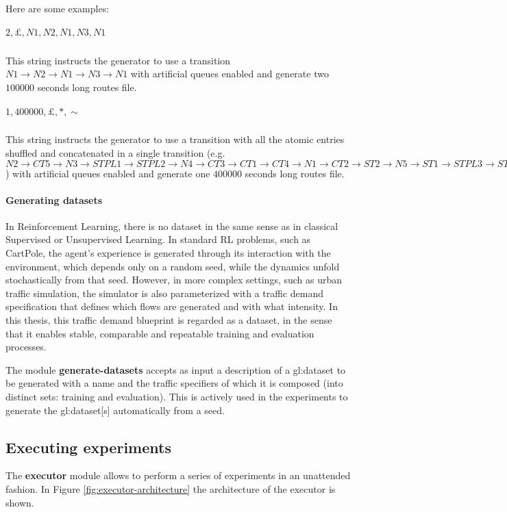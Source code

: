 Here are some examples:

\subparagraph{$2,\pounds,N1,N2,N1,N3,N1$}
This string instructs the generator to use a transition $N1 \rightarrow N2 \rightarrow N1 \rightarrow N3 \rightarrow N1$ with artificial queues enabled and generate two $100000$ seconds long routes file.

\subparagraph{$1,400000,\pounds,*,\sim$}
This string instructs the generator to use a transition with all the atomic entries shuffled and concatenated in a single transition (e.g. $N2 \rightarrow CT5 \rightarrow N3 \rightarrow STPL1 \rightarrow STPL2 \rightarrow N4 \rightarrow CT3 \rightarrow CT1 \rightarrow CT4 \rightarrow N1 \rightarrow CT2 \rightarrow ST2 \rightarrow N5 \rightarrow ST1 \rightarrow STPL3 \rightarrow ST3$) with artificial queues enabled and generate one $400000$ seconds long routes file.

\paragraph{Generating datasets}

In Reinforcement Learning, there is no dataset in the same sense as in classical Supervised or Unsupervised Learning.
In standard RL problems, such as CartPole, the agent’s experience is generated through its interaction with the environment, which depends only on a random seed, while the dynamics unfold stochastically from that seed.
However, in more complex settings, such as urban traffic simulation, the simulator is also parameterized with a traffic demand specification that defines which flows are generated and with what intensity.
In this thesis, this traffic demand blueprint is regarded as a dataset, in the sense that it enables stable, comparable and repeatable training and evaluation processes.

The module \textbf{generate-datasets} accepts as input a description of a \gls{gl:dataset} to be generated with a name and the traffic specifiers of which it is composed (into distinct sets: training and evaluation).
This is actively used in the experiments to generate the \gls{gl:dataset}[s] automatically from a seed.

\subsection{Executing experiments}

The \textbf{executor} module allows to perform a series of experiments in an unattended fashion.
In Figure \ref{fig:executor-architecture} the architecture of the executor is shown.


